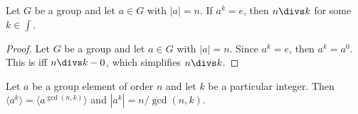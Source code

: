     \begin{cor}
        Let \(G\) be a group and let \(a \in G\) with \(|a| = n\). If \(a^k = e\), then \(n \divs k\) for some \(k\in\int\).
    \end{cor}

    \begin{proof}
        Let \(G\) be a group and let \(a \in G\) with \(|a| = n\). Since \(a^k = e\), then \(a^k = a^0\). This is iff \(n \divs k - 0\), which simplifies \(n \divs k\).
    \end{proof}

    \begin{thm}
        Let \(a\) be a group element of order \(n\) and let \(k\) be a particular integer. Then \(\langle a^k\rangle = \langle a^{\gcd(n,k)}\rangle\) and \(|a^k| = n/\gcd(n, k)\).
    \end{thm}

